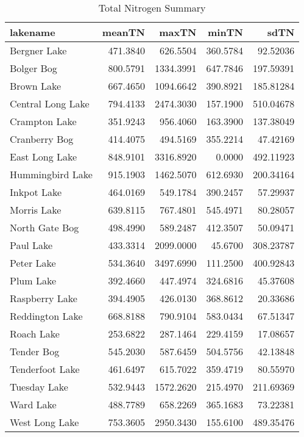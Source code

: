 \documentclass[]{article}
\begin{document}
\begin{table}[t]

\caption{\label{tab:unnamed-chunk-4}Total Nitrogen Summary}
\centering
\begin{tabular}{lrrrr}
\toprule
lakename & meanTN & maxTN & minTN & sdTN\\
\midrule
Bergner Lake & 471.3840 & 626.5504 & 360.5784 & 92.52036\\
Bolger Bog & 800.5791 & 1334.3991 & 647.7846 & 197.59391\\
Brown Lake & 667.4650 & 1094.6642 & 390.8921 & 185.81284\\
Central Long Lake & 794.4133 & 2474.3030 & 157.1900 & 510.04678\\
Crampton Lake & 351.9243 & 956.4060 & 163.3900 & 137.38049\\
\addlinespace
Cranberry Bog & 414.4075 & 494.5169 & 355.2214 & 47.42169\\
East Long Lake & 848.9101 & 3316.8920 & 0.0000 & 492.11923\\
Hummingbird Lake & 915.1903 & 1462.5070 & 612.6930 & 200.34164\\
Inkpot Lake & 464.0169 & 549.1784 & 390.2457 & 57.29937\\
Morris Lake & 639.8115 & 767.4801 & 545.4971 & 80.28057\\
\addlinespace
North Gate Bog & 498.4990 & 589.2487 & 412.3507 & 50.09471\\
Paul Lake & 433.3314 & 2099.0000 & 45.6700 & 308.23787\\
Peter Lake & 534.3640 & 3497.6990 & 111.2500 & 400.92843\\
Plum Lake & 392.4660 & 447.4974 & 324.6816 & 45.37608\\
Raspberry Lake & 394.4905 & 426.0130 & 368.8612 & 20.33686\\
\addlinespace
Reddington Lake & 668.8188 & 790.9104 & 583.0434 & 67.51347\\
Roach Lake & 253.6822 & 287.1464 & 229.4159 & 17.08657\\
Tender Bog & 545.2030 & 587.6459 & 504.5756 & 42.13848\\
Tenderfoot Lake & 461.6497 & 615.7022 & 359.4719 & 80.55970\\
Tuesday Lake & 532.9443 & 1572.2620 & 215.4970 & 211.69369\\
\addlinespace
Ward Lake & 488.7789 & 658.2269 & 365.1683 & 73.22381\\
West Long Lake & 753.3605 & 2950.3430 & 155.6100 & 489.35476\\
\bottomrule
\end{tabular}
\end{table}
\end{document}
